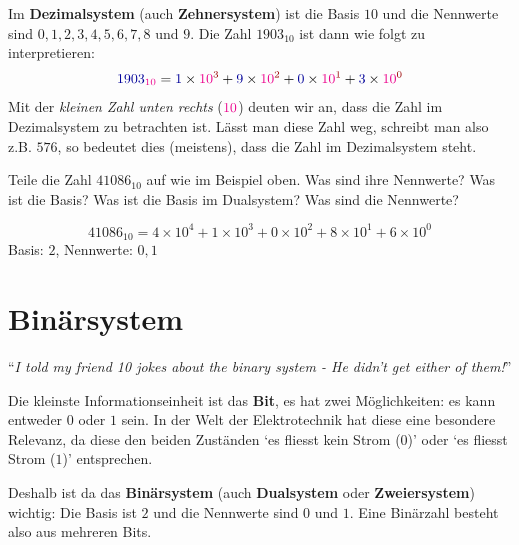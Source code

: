 Im \textbf{Dezimalsystem} (auch \textbf{Zehnersystem}) ist die Basis $10$ und die Nennwerte sind $0,1,2,3,4,5,6,7,8$ und $9$. Die Zahl $1903_{10}$ ist dann wie folgt zu interpretieren:
\begin{align}
	\label{equ dezimalzahl in basis und nennwerten}
	\textcolor{blue}{1903}_{\textcolor{magenta}{10}}
	= \textcolor{blue}{1}\times \textcolor{magenta}{10}^{\textcolor{red}{3}} 
	+ \textcolor{blue}{9}\times \textcolor{magenta}{10}^{\textcolor{red}{2}} 
	+ \textcolor{blue}{0}\times \textcolor{magenta}{10}^{\textcolor{red}{1}} 
	+ \textcolor{blue}{3}\times \textcolor{magenta}{10}^{\textcolor{red}{0}}
\end{align}
Mit der \textit{kleinen Zahl unten rechts} ($\textcolor{magenta}{10}$) deuten wir an, dass die Zahl im Dezimalsystem zu betrachten ist. Lässt man diese Zahl weg, schreibt man also z.B. $576$, so bedeutet dies (meistens), dass die Zahl im Dezimalsystem steht.


\begin{question}
	\begin{tasks}
		\task Teile die Zahl $\num{41086}_{10}$ auf wie im Beispiel oben. Was sind ihre Nennwerte? Was ist die Basis?
		\task Was ist die Basis im Dualsystem? Was sind die Nennwerte?
	\end{tasks}
	\grid{12.2}
\end{question}
\begin{solution}
	\begin{tasks}
		\task $$\num{41086}_{10}
		= 4 \times 10^4 +
		  1 \times 10^3 +
		  0 \times 10^2 +
		  8 \times 10^1 +
		  6 \times 10^0
		$$
		\task Basis: $2$, Nennwerte: $0,1$
	\end{tasks}
\end{solution}

\newpage

\section{Binärsystem}

\begin{center}
	``\textit{I told my friend 10 jokes about the binary system - He didn't get either of them!}''	
\end{center}

\begin{definition}
	Die kleinste Informationseinheit ist das \textbf{Bit}, es hat zwei Möglichkeiten: es kann entweder $0$ oder $1$ sein. In der Welt der Elektrotechnik hat diese eine besondere Relevanz, da diese den beiden Zuständen `es fliesst kein Strom ($0$)' oder `es fliesst Strom ($1$)' entsprechen.
	
	Deshalb ist da das \textbf{Binärsystem} (auch \textbf{Dualsystem} oder \textbf{Zweiersystem}) wichtig: Die Basis ist $2$ und die Nennwerte sind $0$ und $1$. Eine Binärzahl besteht also aus mehreren Bits.
\end{definition}

